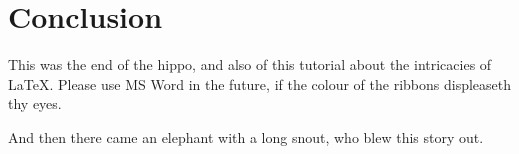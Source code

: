 \section{Conclusion}
\label{sec:Conclusion}

This was the end of the hippo, and also of this tutorial about the intricacies of \LaTeX. Please use MS Word in the future, if the colour of the ribbons displeaseth thy eyes. 

And then there came an elephant with a long snout, who blew this story out.